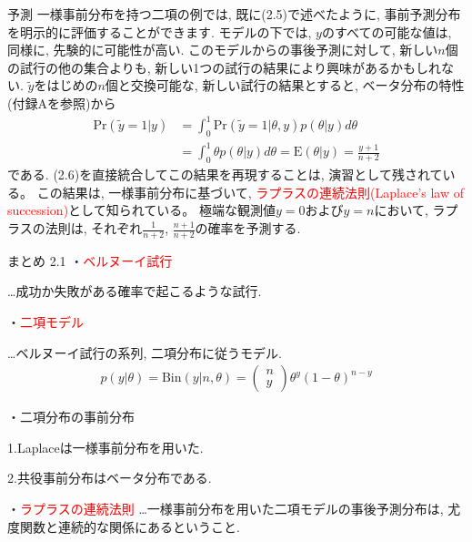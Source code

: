 \documentclass[10pt,dvipdfmx,a4]{beamer}
\newcommand{\eq}[1]{\begin{align}#1\end{align}}
\newcommand{\eqn}[1]{\begin{align*}#1\end{align*}}
\newcommand{\tcr}[1]{\textcolor{red}{#1}}
\begin{document}
\begin{frame}{予測}
一様事前分布を持つ二項の例では, 既に(2.5)で述べたように, 事前予測分布を明示的に評価することができます.
モデルの下では, $y$のすべての可能な値は, 同様に, 先験的に可能性が高い.
このモデルからの事後予測に対して, 新しい$n$個の試行の他の集合よりも, 新しい1つの試行の結果により興味があるかもしれない.
$\tilde{y}$をはじめの$n$個と交換可能な, 新しい試行の結果とすると, ベータ分布の特性(付録Aを参照)から
\eq{\text{Pr}(\tilde{y}=1|y)&=\int_0^1 \text{Pr}(\tilde{y}=1|\theta,y)p(\theta|y)d\theta\nonumber \\
&=\int_0^1 \theta p(\theta|y)d\theta=\text{E}(\theta|y)=\frac{y+1}{n+2}}
である.
(2.6)を直接統合してこの結果を再現することは, 演習として残されている。
この結果は, 一様事前分布に基づいて, \tcr{ラプラスの連続法則(Laplace's law of succession)}として知られている。
極端な観測値$y=0$および$y=n$において, ラプラスの法則は, それぞれ$\tfrac{1}{n+2}$, $\tfrac{n+1}{n+2}$の確率を予測する.
\end{frame}


\begin{frame}[t]{まとめ 2.1}
・\tcr{ベルヌーイ試行}

…成功か失敗がある確率で起こるような試行.

・\tcr{二項モデル}

…ベルヌーイ試行の系列, 二項分布に従うモデル.
\eqn{p(y|\theta)=\text{Bin}(y|n,\theta)=\left(\begin{array}{c}n\\y\end{array}\right)\theta^y(1-\theta)^{n-y}}

・二項分布の事前分布

1.Laplaceは一様事前分布を用いた.

2.共役事前分布はベータ分布である.

・\tcr{ラプラスの連続法則}
…一様事前分布を用いた二項モデルの事後予測分布は, 尤度関数と連続的な関係にあるということ.
\end{frame}

\end{document}
